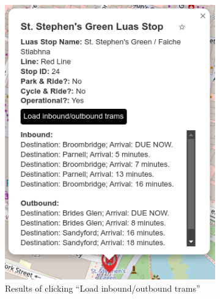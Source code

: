 \documentclass[a4paper,11pt]{report}
\begin{document}
\begin{figure}[H]
    \centering
    \begin{subfigure}[c]{0.45\textwidth}
        \centering
        \includegraphics[width=\textwidth]{./images/loadinboundoutbound.png}
        \caption{Results of clicking ``Load inbound/outbound trams''}
    \end{subfigure}
    \hfill
    \begin{subfigure}[c]{0.38\textwidth}
        \centering

\end{subfigure}
\end{figure}
\end{document}
